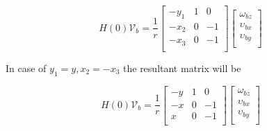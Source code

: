 \documentclass{article}
\begin{document}
\begin{equation}
    H(0)\mathcal{V}_b = \frac{1}{r}
    \begin{bmatrix}
        -y_1 & 1 & 0  \\
        -x_2 & 0 & -1 \\
        -x_3 & 0 & -1 \\
    \end{bmatrix}
    \begin{bmatrix}
        \omega_{bz}   \\
        \upsilon_{bx} \\
        \upsilon_{by} \\
    \end{bmatrix}
\end{equation}

In case of $ y_1 = y, x_2 = -x_3$ the resultant matrix will be

\begin{equation}
    H(0)\mathcal{V}_b = \frac{1}{r}
    \begin{bmatrix}
        -y & 1 & 0  \\
        -x & 0 & -1 \\
        x & 0 & -1 \\
    \end{bmatrix}
    \begin{bmatrix}
        \omega_{bz}   \\
        \upsilon_{bx} \\
        \upsilon_{by} \\
    \end{bmatrix}
\end{equation}
\end{document}
